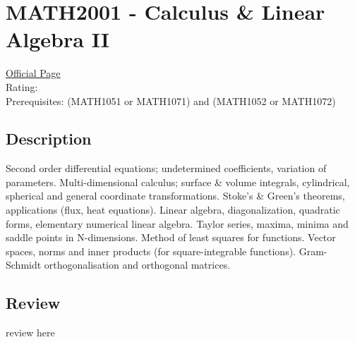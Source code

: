 \hypertarget{MATH2001}{\section{MATH2001 - Calculus \& Linear Algebra II}}

\large
\textcolor{turbo_purple}{\href{https://my.uq.edu.au/programs-courses/course.html?course_code=MATH2001}{Official Page}} \\
Rating: \cstar\cstar\cstar\cstar\ostar \\
Prerequisites: (MATH1051 or MATH1071) and (MATH1052 or MATH1072)

\normalsize
\subsection*{Description}
Second order differential equations; undetermined coefficients, variation of parameters.
Multi-dimensional calculus; surface \& volume integrals, cylindrical, spherical and general coordinate transformations.
Stoke's \& Green's theorems, applications (flux, heat equations).
Linear algebra, diagonalization, quadratic forms, elementary numerical linear algebra.
Taylor series, maxima, minima and saddle points in N-dimensions. Method of least squares for functions.
Vector spaces, norms and inner products (for square-integrable functions).
Gram-Schmidt orthogonalisation and orthogonal matrices.

\subsection*{Review}
review here
